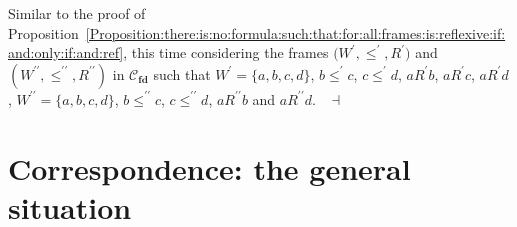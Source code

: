 \documentclass[draft]{article}
\newenvironment{proof}{{\bf Proof:}}{~$\dashv$\\}
\def\fdcfra{\mathbf{fd}}
\begin{document}
%
%
\begin{proof}
%
%
Similar to the proof of Proposition~\ref{Proposition:there:is:no:formula:such:that:for:all:frames:is:reflexive:if:and:only:if:and:ref}, this time considering the frames $(W^{\prime},{\leq^{\prime}},
%
%
%
%
%
%
%
$\linebreak$
%
%
%
%
%
%
{R^{\prime}})$ and $(W^{\prime\prime},{\leq^{\prime\prime}},{R^{\prime\prime}})$ in ${\mathcal C}_{\fdcfra}$ such that $W^{\prime}{=}\{a,b,c,d\}$, $b{\leq^{\prime}}c$, $c{\leq^{\prime}}d$, $a{R^{\prime}}b$, $a{R^{\prime}}c$, $a{R^{\prime}}d$, $W^{\prime\prime}{=}\{a,b,c,d\}$, $b{\leq}^{\prime\prime}c$, $c{\leq}^{\prime\prime}d$, $a{R^{\prime\prime}}b$ and $a{R^{\prime\prime}}d$.
%
%
\medskip
%
%
\end{proof}
%
%
%
%
\section{Correspondence: the general situation}\label{section:correspondence:general:situation}
%
%
%
%
\end{document}
